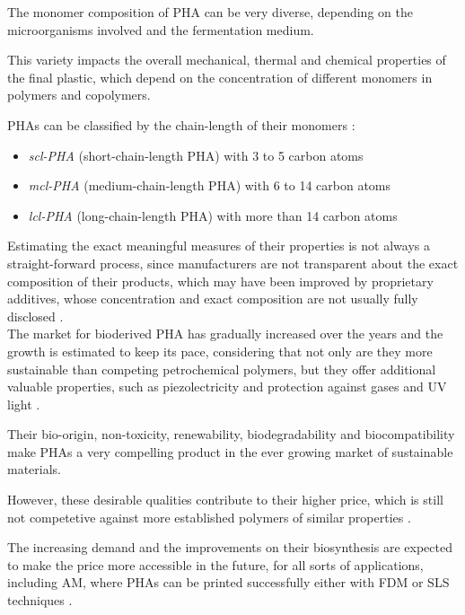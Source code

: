 \documentclass[a4paper]{article}
\begin{document}
    The monomer composition of PHA can be very diverse, depending on the microorganisms involved and the fermentation medium. 
    
    This variety impacts the overall mechanical, thermal and chemical properties of the final plastic, which depend on the concentration of 
    different monomers in polymers and copolymers. 

    PHAs can be classified by the chain-length of their monomers \autocite*{Messori_Bondioli_PHAs}: 

    \begin{itemize}
        \item \textit{scl-PHA} (short-chain-length PHA) with 3 to 5 carbon atoms
        \item \textit{mcl-PHA} (medium-chain-length PHA) with 6 to 14 carbon atoms
        \item \textit{lcl-PHA} (long-chain-length PHA) with more than 14 carbon atoms
    \end{itemize}


    Estimating the exact meaningful measures of their properties is not always a straight-forward process, 
    since manufacturers are not transparent about the exact composition of their products, which may have been 
    improved by proprietary additives, whose concentration and exact composition are not usually fully disclosed \autocite{Kovalcik_PHA_Review}. \\ 
    
    The market for bioderived PHA has gradually increased over the years and the growth is estimated to keep its pace, considering that not only are they more sustainable
    than competing petrochemical polymers, but they offer additional valuable properties, such as piezolectricity 
    and protection against gases and UV light \autocite{Kovalcik_PHA_Review,KBV_Research_AM_market}.

    Their bio-origin, non-toxicity, renewability, biodegradability and biocompatibility make PHAs a very compelling product in the 
    ever growing market of sustainable materials. 

    However, these desirable qualities contribute to their higher price, which is still not competetive against more established 
    polymers of similar properties \autocites{Kovalcik_PHA_Review,Markets_machines_materials}. 

    The increasing demand and the improvements on their biosynthesis are expected to make the price more accessible in the future, for all sorts of 
    applications, including AM, where PHAs can be printed successfully either with FDM or SLS techniques \autocites{Kovalcik_PHA_Review}. 
    
\end{document}
